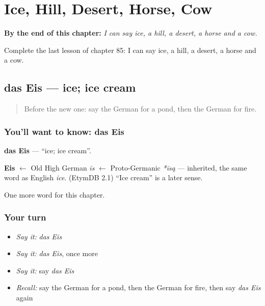 
\chapter{Ice, Hill, Desert, Horse, Cow}
\label{ch:ge-ice-hill-desert-horse-cow}

\begin{chapteropening}
\textbf{By the end of this chapter:} \emph{I can say ice, a hill, a desert, a horse and a cow.}

Complete the last lesson of chapter 85: I can say ice, a hill, a desert, a horse and a cow.
\end{chapteropening}

\section[das Eis]{das Eis — ice; ice cream}

\label{lesson:GE-C85-eis}



\begin{quote}
Before the new one: say the German for a pond, then the German for fire.
\end{quote}

\subsection*{You'll want to know: das Eis}
\textbf{das Eis} — \textquotedblleft{}ice; ice cream\textquotedblright{}.

\begin{cousinweb}
\textbf{Eis} $\leftarrow$ Old High German \emph{īs} $\leftarrow$ Proto-Germanic \emph{*īsą} — inherited, the same word as English \emph{ice}. (EtymDB 2.1) \textquotedblleft{}Ice cream\textquotedblright{} is a later sense.
\end{cousinweb}

\begin{grammarlens}[title={What you've built}]
One more word for this chapter.
\end{grammarlens}

\subsection*{Your turn}
\begin{itemize}
\raggedright
  \item \emph{Say it:} \emph{das Eis}
  \item \emph{Say it:} \emph{das Eis}, once more
  \item \emph{Say it:} say \emph{das Eis}
  \item \emph{Recall:} say the German for a pond, then the German for fire, then say \emph{das Eis} again
\end{itemize}

